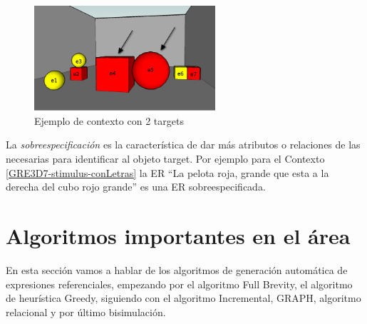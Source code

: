 \begin{figure}[ht]
\centering
\includegraphics[width=0.6\textwidth]{images/22-plural.jpg}
\caption{Ejemplo de contexto con 2 targets}
\label{plurales}
\end{figure}

La {\it sobreespecificaci\'on} es la caracter\'istica de dar m\'as atributos o relaciones de las necesarias para identificar al objeto target. Por ejemplo para el Contexto \ref{GRE3D7-stimulus-conLetras} la ER ``La pelota roja, grande que esta a la derecha del cubo rojo grande'' es una ER sobreespecificada.\\


\section{Algoritmos importantes en el \'area}

En esta secci\'on vamos a hablar de los algoritmos de generaci\'on autom\'atica de expresiones referenciales, empezando por el algoritmo Full Brevity, el algoritmo de heur\'istica Greedy, siguiendo con el algoritmo Incremental, GRAPH, algoritmo relacional y por \'ultimo bisimulaci\'on.  \\



